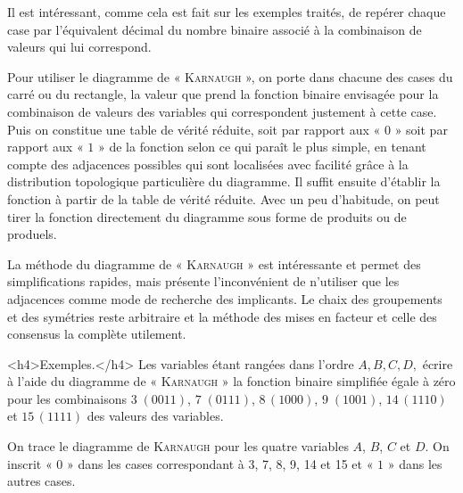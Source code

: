 Il est intéressant, comme cela est fait sur les exemples traités, de repérer chaque case par l'équivalent décimal du nombre binaire associé à la combinaison de valeurs qui lui correspond.


Pour utiliser le diagramme de  « \textsc{Karnaugh} », on porte dans chacune des cases du carré ou du rectangle, la valeur que prend la fonction binaire envisagée pour la combinaison de valeurs des variables qui correspondent justement à cette case. Puis on constitue une table de vérité réduite, soit par rapport aux « $0$ » soit par rapport aux « $1$ » de la fonction selon ce qui paraît le plus simple, en tenant compte des adjacences possibles qui sont localisées avec facilité grâce à la distribution topologique particulière du diagramme. Il suffit ensuite d'établir la fonction à partir de la table de vérité réduite. Avec un peu d'habitude, on peut tirer la fonction directement du diagramme sous forme de produits ou de produels.

La méthode du diagramme de « \textsc{Karnaugh} » est intéressante et permet des simplifications rapides, mais présente l'inconvénient de n'utiliser que les adjacences comme mode de recherche des implicants. Le chaix des groupements et des symétries reste arbitraire et la méthode des mises en facteur et celle des consensus la complète utilement. 


<h4>Exemples.</h4> Les variables étant rangées dans l'ordre $A, B, C, D,$ écrire à l'aide du diagramme de  « \textsc{Karnaugh} »  la fonction binaire simplifiée égale à zéro pour les combinaisons $ 3\;(0011)$, $7\; (0111)$, $8\, (1000)$, $9\; (1001)$, $14\, (1110)$  et $15\, (1111)$ des valeurs des variables. 

On trace le diagramme de \textsc{Karnaugh} pour les quatre variables $A$, $B$, $C$ et $D$. On inscrit « $0$ » dans les cases correspondant à 3, 7, 8, 9, 14 et 15 et  « $1$ » dans les autres cases. 



